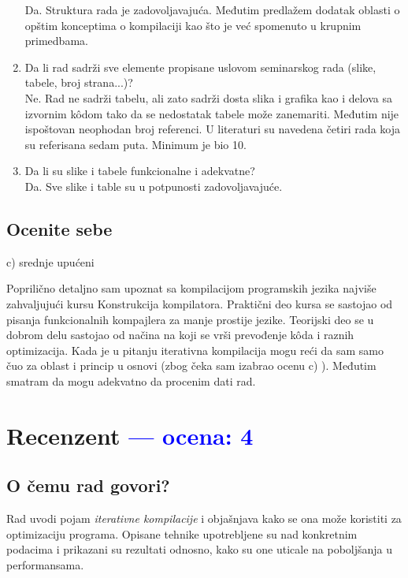 \documentclass[a4paper]{report}
\newcommand{\odgovor}[1]{\textcolor{blue}{#1}}
\begin{document}
\begin{enumerate}
Da. Struktura rada je zadovoljavajuća. Međutim predlažem dodatak oblasti o opštim konceptima o kompilaciji kao što je već spomenuto u krupnim primedbama.
\item Da li rad sadrži sve elemente propisane uslovom seminarskog rada (slike, tabele, broj strana...)?\\
Ne. Rad ne sadrži tabelu, ali zato sadrži dosta slika i grafika kao i delova sa izvornim kôdom tako da se nedostatak tabele može zanemariti. Međutim nije ispoštovan neophodan broj referenci. U literaturi su navedena četiri rada koja su referisana sedam puta. Minimum je bio 10.
\item Da li su slike i tabele funkcionalne i adekvatne?\\
Da. Sve slike i table su u potpunosti zadovoljavajuće.
\end{enumerate}

\section{Ocenite sebe}
c) srednje upućeni

Poprilično detaljno sam upoznat sa kompilacijom programskih jezika najviše zahvaljujući kursu Konstrukcija kompilatora. Praktični deo kursa se sastojao od pisanja funkcionalnih kompajlera za manje prostije jezike. Teorijski deo se u dobrom delu sastojao od načina na koji se vrši prevođenje kôda i raznih optimizacija. Kada je u pitanju iterativna kompilacija mogu reći da sam samo čuo za oblast i princip u osnovi (zbog čeka sam izabrao ocenu c) ). Međutim smatram da mogu adekvatno da procenim dati rad.



\chapter{Recenzent \odgovor{--- ocena: 4} }


\section{O čemu rad govori?}

Rad uvodi pojam \textit{iterativne kompilacije} i objašnjava kako se ona može koristiti za optimizaciju programa. Opisane tehnike upotrebljene su nad konkretnim podacima i prikazani su rezultati odnosno, kako su one uticale na poboljšanja u performansama. 
\end{document}
